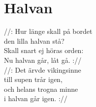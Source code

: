 \section{Halvan}
//: Hur länge skall på bordet\\
den lilla halvan stå?\\
Skall snart ej höras orden:\\
Nu halvan går, låt gå. ://\\
//: Det ärvde vikingsinne\\
till supen trår igen,\\
och helans trogna minne\\
i halvan går igen. ://\\